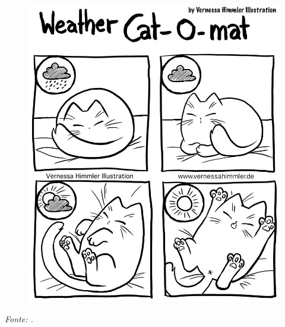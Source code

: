 \begin{agradecimentos}
\end{agradecimentos}

\begin{epigrafe}
	\vspace*{\fill}
	\begin{flushright}
		\begin{figure}[hb]
			\includegraphics[width=0.5\columnwidth,right]{figs/cat_meme.jpg}
		\end{figure}
		\textit{Fonte: .}
	\end{flushright}
\end{epigrafe}
